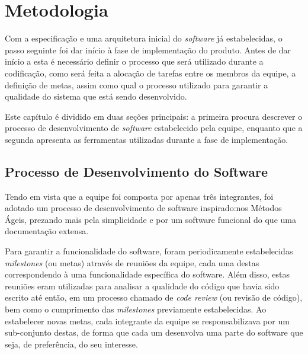 
\chapter{Metodologia}
\label{metod}


Com a especificação e uma arquitetura inicial do \emph{software} já estabelecidas, o passo seguinte foi dar início à fase de implementação do produto.
Antes de dar início a esta é necessário definir o processo que será utilizado durante a codificação, como será feita a alocação de tarefas entre os membros da equipe, a definição de metas, assim como qual o processo utilizado para garantir a qualidade do sistema que está sendo desenvolvido.

Este capítulo é dividido em duas seções principais: a primeira procura descrever o processo de desenvolvimento de \emph{software} estabelecido pela equipe, enquanto que a segunda apresenta as ferramentas utilizadas durante a fase de implementação.


\section{Processo de Desenvolvimento do Software}

Tendo em vista que a equipe foi composta por apenas três integrantes, foi adotado um processo de desenvolvimento de software inspirado:nos Métodos Ágeis, prezando mais pela simplicidade e por um software funcional do que uma documentação extensa.

Para garantir a funcionalidade do software, foram periodicamente estabelecidas \emph{milestones} (ou metas) através de reuniões da equipe, cada uma destas correspondendo à uma funcionalidade específica do software.
Além disso, estas reuniões eram utilizadas para analisar a qualidade do código que havia sido escrito até então, em um processo chamado de \emph{code review} (ou revisão de código), bem como o cumprimento das \emph{milestones} previamente estabelecidas.
Ao estabelecer novas metas, cada integrante da equipe se responsabilizava por um sub-conjunto destas, de forma que cada um desenvolva uma parte do software que seja, de preferência, do seu interesse.


